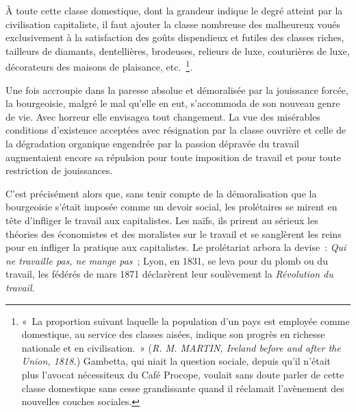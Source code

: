 \documentclass[french,twoside]{book} %
\begin{document}
\noindent À toute cette classe domestique, dont la grandeur indique le degré atteint par la civilisation capitaliste, il faut ajouter la classe nombreuse des malheureux voués exclusivement à la satisfaction des goûts dispendieux et futiles des classes riches, tailleurs de diamants, dentellières, brodeuses, relieurs de luxe, couturières de luxe, décorateurs des maisons de plaisance, etc. \footnote{« La proportion suivant laquelle la population d’un pays est employée comme domestique, au service des classes aisées, indique son progrès en richesse nationale et en civilisation. » (\emph{R. M. MARTIN, Ireland before and after the Union, 1818.}) Gambetta, qui niait la question sociale, depuis qu’il n’était plus l’avocat nécessiteux du Café Procope, voulait sans doute parler de cette classe domestique sans cesse grandissante quand il réclamait l’avènement des nouvelles couches sociales.}.\par
Une fois accroupie dans la paresse absolue et démoralisée par la jouissance forcée, la bourgeoisie, malgré le mal qu’elle en eut, s’accommoda de son nouveau genre de vie. Avec horreur elle envisagea tout changement. La vue des misérables conditions d’existence acceptées avec résignation par la classe ouvrière et celle de la dégradation organique engendrée par la passion dépravée du travail augmentaient encore sa répulsion pour toute imposition de travail et pour toute restriction de jouissances.\par
C’est précisément alors que, sans tenir compte de la démoralisation que la bourgeoisie s’était imposée comme un devoir social, les prolétaires se mirent en tête d’infliger le travail aux capitalistes. Les naïfs, ils prirent au sérieux les théories des économistes et des moralistes sur le travail et se sanglèrent les reins pour en infliger la pratique aux capitalistes. Le prolétariat arbora la devise : \emph{Qui ne travaille pas, ne mange pas} ; Lyon, en 1831, se leva pour du plomb ou du travail, les fédérés de mars 1871 déclarèrent leur soulèvement la \emph{Révolution du travail.}\par
\end{document}
